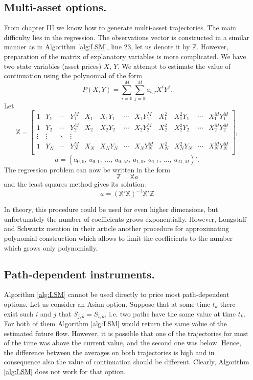 \documentclass[a4paper,11pt, twoside]{book}
\theoremstyle{definition}
\theoremstyle{remark}
\begin{document}
\subsection{Multi-asset options.}
From chapter III we know how to generate multi-asset trajectories. The main difficulty lies in the regression. The observations vector is constructed in a similar manner as in Algorithm \ref{alg:LSM}, line 23, let us denote it by $\mathbb{Z}$. However, preparation of the matrix of explanatory variables is more complicated. We have two state variables (asset prices) $X$, $Y$. We attempt to estimate the value of continuation using the polynomial of the form 
\[ P(X,Y) = \sum\limits_{i=0}^M \sum\limits_{j=0}^M a_{i,j} X^i Y^j. \]
Let
\begin{equation*}
 \mathbb{X} = \left[ \begin{array}{cccccccccccc}
           1 & Y_1 & \cdots & Y_1^M & X_1 & X_1 Y_1 & \cdots & X_1 Y_1^M & X_1^2 & X_1^2 Y_1 & \cdots & X_1^M Y_1^M \\
           1 & Y_2 & \cdots & Y_2^M & X_2 & X_2 Y_2 & \cdots & X_2 Y_2^M & X_2^2 & X_2^2 Y_2 & \cdots & X_2^M Y_2^M \\
           \vdots & \vdots & \ddots & \vdots \\
           1 & Y_N & \cdots & Y_N^M & X_N & X_N Y_N & \cdots & X_N Y_N^M & X_N^2 & X_N^2 Y_N & \cdots & X_N^M Y_N^M \\
          \end{array} \right],
\end{equation*}
\[ a = (a_{0,0},\ a_{0,1},\ \ldots,\ a_{0,M},\ a_{1,0},\ a_{1,1},\ \ldots,\ a_{M,M})'. \]
The regression problem can now be written in the form 
\[ \mathbb{Z} = \mathbb{X} a \]
and the least squares method gives its solution:
\[ a = (\mathbb{X}'\mathbb{X})^{-1}\mathbb{X}' \mathbb{Z} \]

In theory, this procedure could be used for even higher dimensions, but unfortunately the number of coefficients grows exponentially. However, Longstaff and Schwartz mention in their article another procedure for approximating polynomial construction which allows to limit the coefficients to the number which grows only polynomially. 

\subsection{Path-dependent instruments.}
Algorithm \ref{alg:LSM} cannot be used directly to price most path-dependent options. Let us consider an Asian option. Suppose that at some time $t_k$ there exist such $i$ and $j$ that $S_{j,k} = S_{i,k}$, i.e. two paths have the same value at time $t_k$. For both of them Algorithm \ref{alg:LSM} would return the same value of the estimated future flow. However, it is possible that one of the trajectories for most of the time was above the current value, and the second one was below. Hence, the difference between the averages on both trajectories is high and in consequence also the value of continuation should be different. Clearly, Algorithm \ref{alg:LSM} does not work for that option.
\end{document}
